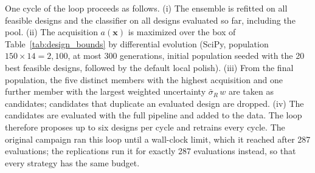 One cycle of the loop proceeds as follows. (i) The ensemble is refitted on all feasible designs and the classifier on all designs evaluated so far, including the pool. (ii) The acquisition $a(\mathbf{x})$ is maximized over the box of Table~\ref{tab:design_bounds} by differential evolution (SciPy, population $150 \times 14 = 2{,}100$, at most 300 generations, initial population seeded with the 20 best feasible designs, followed by the default local polish). (iii) From the final population, the five distinct members with the highest acquisition and one further member with the largest weighted uncertainty $\bar{\sigma}_R\, w$ are taken as candidates; candidates that duplicate an evaluated design are dropped. (iv) The candidates are evaluated with the full pipeline and added to the data. The loop therefore proposes up to six designs per cycle and retrains every cycle. The original campaign ran this loop until a wall-clock limit, which it reached after 287 evaluations; the replications run it for exactly 287 evaluations instead, so that every strategy has the same budget.

